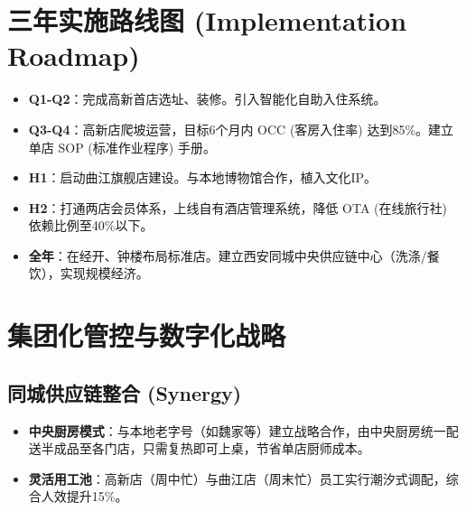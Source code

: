 \documentclass{cumcmthesis}
\begin{document}
\section{三年实施路线图 (Implementation Roadmap)}

\begin{tcolorbox}[colback=bglight, colframe=primary, title=\textbf{第一年：生存与验证 (Phase 1)}]
    \begin{itemize}
        \item \textbf{Q1-Q2}：完成高新首店选址、装修。引入智能化自助入住系统。
        \item \textbf{Q3-Q4}：高新店爬坡运营，目标6个月内 OCC (客房入住率) 达到85\%。建立单店 SOP (标准作业程序) 手册。
    \end{itemize}
\end{tcolorbox}

\begin{tcolorbox}[colback=bglight, colframe=primary, title=\textbf{第二年：复制与品牌 (Phase 2)}]
    \begin{itemize}
        \item \textbf{H1}：启动曲江旗舰店建设。与本地博物馆合作，植入文化IP。
        \item \textbf{H2}：打通两店会员体系，上线自有酒店管理系统，降低 OTA (在线旅行社) 依赖比例至40\%以下。
    \end{itemize}
\end{tcolorbox}

\begin{tcolorbox}[colback=bglight, colframe=primary, title=\textbf{第三年：规模与生态 (Phase 3)}]
    \begin{itemize}
        \item \textbf{全年}：在经开、钟楼布局标准店。建立西安同城中央供应链中心（洗涤/餐饮），实现规模经济。
    \end{itemize}
\end{tcolorbox}

\section{集团化管控与数字化战略}

\subsection{同城供应链整合 (Synergy)}
\begin{itemize}
    \item \textbf{中央厨房模式}：与本地老字号（如魏家等）建立战略合作，由中央厨房统一配送半成品至各门店，只需复热即可上桌，节省单店厨师成本。
    \item \textbf{灵活用工池}：高新店（周中忙）与曲江店（周末忙）员工实行潮汐式调配，综合人效提升15\%。
\end{itemize}
\end{document}
